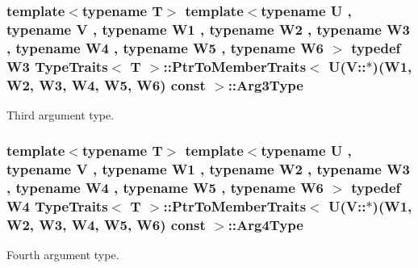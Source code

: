 \subsubsection[{\texorpdfstring{Arg3\+Type}{Arg3Type}}]{\setlength{\rightskip}{0pt plus 5cm}template$<$typename T$>$ template$<$typename U , typename V , typename W1 , typename W2 , typename W3 , typename W4 , typename W5 , typename W6 $>$ typedef W3 {\bf Type\+Traits}$<$ T $>$\+::{\bf Ptr\+To\+Member\+Traits}$<$ U(V\+::$\ast$)(W1, W2, W3, W4, W5, W6) const  $>$\+::{\bf Arg3\+Type}}\hypertarget{structTypeTraits_1_1PtrToMemberTraits_3_01U_07V_1_1_5_08_07W1_00_01W2_00_01W3_00_01W4_00_01W5_00_01W6_08_01const_01_01_4_a341847c376693c11ea1b36b4c84d202c}{}\label{structTypeTraits_1_1PtrToMemberTraits_3_01U_07V_1_1_5_08_07W1_00_01W2_00_01W3_00_01W4_00_01W5_00_01W6_08_01const_01_01_4_a341847c376693c11ea1b36b4c84d202c}
Third argument type. 
\subsubsection[{\texorpdfstring{Arg4\+Type}{Arg4Type}}]{\setlength{\rightskip}{0pt plus 5cm}template$<$typename T$>$ template$<$typename U , typename V , typename W1 , typename W2 , typename W3 , typename W4 , typename W5 , typename W6 $>$ typedef W4 {\bf Type\+Traits}$<$ T $>$\+::{\bf Ptr\+To\+Member\+Traits}$<$ U(V\+::$\ast$)(W1, W2, W3, W4, W5, W6) const  $>$\+::{\bf Arg4\+Type}}\hypertarget{structTypeTraits_1_1PtrToMemberTraits_3_01U_07V_1_1_5_08_07W1_00_01W2_00_01W3_00_01W4_00_01W5_00_01W6_08_01const_01_01_4_a06b42a6ce0a9c97c9f437f7cac576e0c}{}\label{structTypeTraits_1_1PtrToMemberTraits_3_01U_07V_1_1_5_08_07W1_00_01W2_00_01W3_00_01W4_00_01W5_00_01W6_08_01const_01_01_4_a06b42a6ce0a9c97c9f437f7cac576e0c}
Fourth argument type. 
